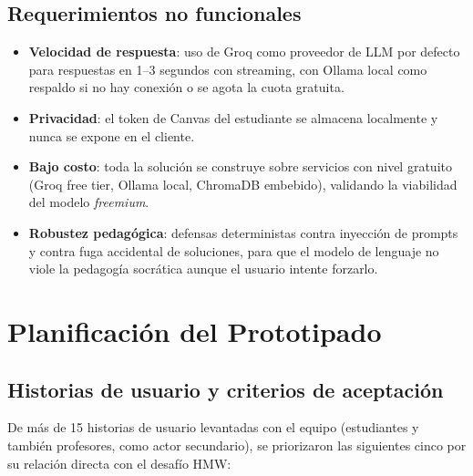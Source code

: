 \documentclass[11pt,a4paper]{article}
\begin{document}
\subsection{Requerimientos no funcionales}

\begin{itemize}[itemsep=1pt]
\item \textbf{Velocidad de respuesta}: uso de Groq como proveedor de LLM por defecto para respuestas en 1--3 segundos con streaming, con Ollama local como respaldo si no hay conexi\'on o se agota la cuota gratuita.
\item \textbf{Privacidad}: el token de Canvas del estudiante se almacena localmente y nunca se expone en el cliente.
\item \textbf{Bajo costo}: toda la soluci\'on se construye sobre servicios con nivel gratuito (Groq free tier, Ollama local, ChromaDB embebido), validando la viabilidad del modelo \emph{freemium}.
\item \textbf{Robustez pedag\'ogica}: defensas deterministas contra inyecci\'on de prompts y contra fuga accidental de soluciones, para que el modelo de lenguaje no viole la pedagog\'ia socr\'atica aunque el usuario intente forzarlo.
\end{itemize}

\section{Planificaci\'on del Prototipado}

\subsection{Historias de usuario y criterios de aceptaci\'on}

De m\'as de 15 historias de usuario levantadas con el equipo (estudiantes y tambi\'en profesores, como actor secundario), se priorizaron las siguientes cinco por su relaci\'on directa con el desaf\'io HMW:
\end{document}
